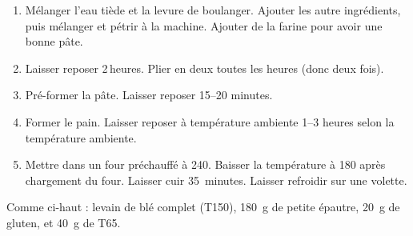 
\begin{ingredients}
\end{ingredients}


\begin{recipe}
  \begin{enumerate}

  \item Mélanger l'eau tiède et la levure de boulanger.  Ajouter les
    autre ingrédients, puis mélanger et pétrir à la machine.  Ajouter
    de la farine pour avoir une bonne pâte.
    
  \item Laisser reposer 2$\,$\fracH heures.  Plier en deux toutes les
    heures (donc deux fois).
    
  \item Pré-former la pâte.  Laisser reposer 15--20 minutes.
    
  \item Former le pain.  Laisser reposer à température ambiente 1--3
    heures selon la température ambiente.
    
  \item Mettre dans un four préchauffé à 240\degreeC.  Baisser la
    température à 180\degreeC{} après chargement du four.  Laisser cuir
    35~minutes.  Laisser refroidir sur une volette.

  \end{enumerate}
\end{recipe}


Comme ci-haut : levain de blé complet (T150), 180~g de petite épautre,
20~g de gluten, et 40~g de T65.

